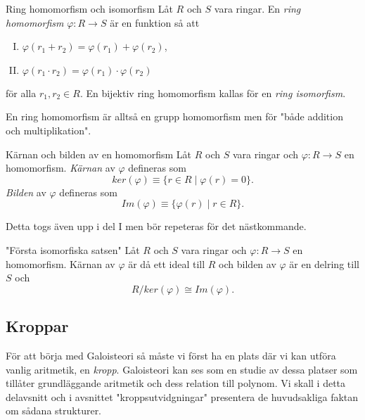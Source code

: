 \documentclass{article}
\theoremstyle{definition}
\begin{document}
\begin{mydef}{Ring homomorfism och isomorfism}{}
  Låt $R$ och $S$ vara ringar. En \textit{ring homomorfism} $\varphi: R \rightarrow S$ är en funktion så att 
  \begin{enumerate}[I)]
    \item $\varphi(r_1 + r_2) = \varphi(r_1) + \varphi(r_2)$,
    \item $\varphi(r_1 \cdot r_2) = \varphi(r_1) \cdot \varphi(r_2)$
  \end{enumerate}
  för alla $r_1, r_2 \in R$. En bijektiv ring homomorfism kallas för en \textit{ring isomorfism}.
\end{mydef}
En ring homomorfism är alltså en grupp homomorfism men för "både addition och multiplikation".

\begin{mydef}{Kärnan och bilden av en homomorfism}{}
  Låt $R$ och $S$ vara ringar och $\varphi: R \rightarrow S$ en homomorfism. \textit{Kärnan} av $\varphi$
  defineras som 
  \[ker(\varphi) \equiv \{r \in R \; | \; \varphi(r) = 0\}.\]
  \textit{Bilden} av $\varphi$ defineras som 
  \[Im(\varphi) \equiv \{\varphi(r) \; | \; r \in R\}.\]
\end{mydef}
Detta togs även upp i del I men bör repeteras för det nästkommande. 
\begin{mytheo}{"Första isomorfiska satsen"}{}
  Låt $R$ och $S$ vara ringar och $\varphi: R \rightarrow S$ en homomorfism. Kärnan av $\varphi$ är då ett ideal till $R$ och bilden av $\varphi$ är en 
  delring till $S$ och 
  \[R/ker(\varphi) \cong Im(\varphi).\]
\end{mytheo}

\begin{center}
\end{center}

\subsection{Kroppar}
För att börja med Galoisteori så måste vi först ha en plats där vi kan utföra vanlig aritmetik, en \textit{kropp}. Galoisteori kan ses som en studie 
av dessa platser som tillåter grundläggande aritmetik och dess relation till polynom. Vi skall i detta delavsnitt och i avsnittet "kroppsutvidgningar" 
presentera de huvudsakliga faktan om 
sådana strukturer. 
\end{document}
